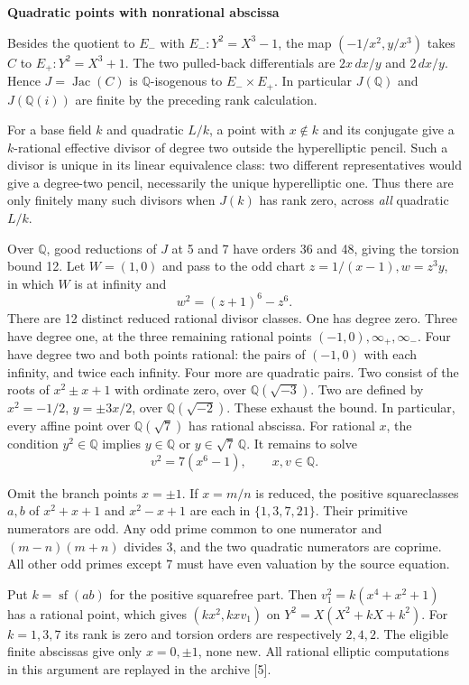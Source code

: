 \documentclass[12pt]{article}
\newcommand{\Q}{\mathbb Q}\newcommand{\Z}{\mathbb Z}
\newcommand{\head}[1]{{\Large\bfseries\color{ink}#1}\par\vspace{3pt}}
\newcommand{\sub}[1]{\par\smallskip{\bfseries\color{green}#1}\par}
\begin{document}
\newpage
\head{Quadratic points with nonrational abscissa}
Besides the quotient to $E_-$ with $E_-:Y^2=X^3-1$, the map $(-1/x^2,y/x^3)$ takes $C$ to $E_+:Y^2=X^3+1$. The two pulled-back differentials are $2x\,dx/y$ and $2\,dx/y$. Hence $J=\operatorname{Jac}(C)$ is $\Q$-isogenous to $E_-\times E_+$. In particular $J(\Q)$ and $J(\Q(i))$ are finite by the preceding rank calculation.

For a base field $k$ and quadratic $L/k$, a point with $x\notin k$ and its conjugate give a $k$-rational effective divisor of degree two outside the hyperelliptic pencil. Such a divisor is unique in its linear equivalence class: two different representatives would give a degree-two pencil, necessarily the unique hyperelliptic one. Thus there are only finitely many such divisors when $J(k)$ has rank zero, across \emph{all} quadratic $L/k$.

Over $\Q$, good reductions of $J$ at 5 and 7 have orders 36 and 48, giving the torsion bound 12. Let $W=(1,0)$ and pass to the odd chart $z=1/(x-1), w=z^3 y$, in which $W$ is at infinity and
\[
 w^2=(z+1)^6-z^6.
\]
There are 12 distinct reduced rational divisor classes. One has degree zero. Three have degree one, at the three remaining rational points $(-1,0),\infty_+,\infty_-$. Four have degree two and both points rational: the pairs of $(-1,0)$ with each infinity, and twice each infinity. Four more are quadratic pairs. Two consist of the roots of $x^2\pm x+1$ with ordinate zero, over $\Q(\sqrt{-3})$. Two are defined by $x^2=-1/2$, $y=\pm 3x/2$, over $\Q(\sqrt{-2})$. These exhaust the bound. In particular, every affine point over $\Q(\sqrt7)$ has rational abscissa. For rational $x$, the condition $y^2\in\Q$ implies $y\in\Q$ or $y\in\sqrt7\,\Q$. It remains to solve
\[
                 v^2=7(x^6-1),\qquad x,v\in\Q .
\]

\sub{Reduction to two simultaneous quartics}
Omit the branch points $x=\pm1$. If $x=m/n$ is reduced, the positive squareclasses $a,b$ of $x^2+x+1$ and $x^2-x+1$ are each in $\{1,3,7,21\}$. Their primitive numerators are odd. Any odd prime common to one numerator and $(m-n)(m+n)$ divides 3, and the two quadratic numerators are coprime. All other odd primes except 7 must have even valuation by the source equation.

Put $k=\operatorname{sf}(ab)$ for the positive squarefree part. Then $v_1^2=k(x^4+x^2+1)$ has a rational point, which gives $(kx^2,kxv_1)$ on $Y^2=X(X^2+kX+k^2)$. For $k=1,3,7$ its rank is zero and torsion orders are respectively $2,4,2$. The eligible finite abscissas give only $x=0,\pm1$, none new. All rational elliptic computations in this argument are replayed in the archive [5].
\end{document}
